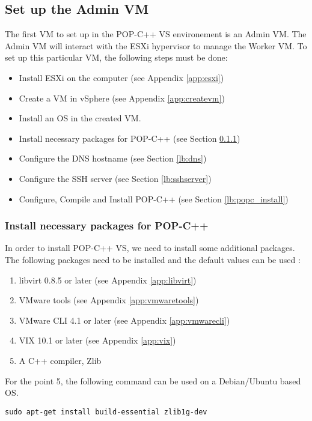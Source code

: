 \subsection{Set up the Admin VM}
\label{lb:adminvm}
The first VM to set up in the POP-C++ VS environement is an Admin VM. The Admin VM will interact with the ESXi hypervisor to manage the Worker VM. To set up this particular VM, the following steps must be done:

\begin{itemize}
\item Install ESXi on the computer (see Appendix \ref{app:esxi})
\item Create a VM in vSphere (see Appendix \ref{app:createvm})
\item Install an OS in the created VM. 
\item Install necessary packages for POP-C++ (see Section \ref{lb:packages})
\item Configure the DNS hostname (see Section \ref{lb:dns})
\item Configure the SSH server (see Section \ref{lb:sshserver})
\item Configure, Compile and Install POP-C++ (see Section \ref{lb:popc_install})
\end{itemize}

\subsubsection{Install necessary packages for POP-C++}
\label{lb:packages}
In order to install POP-C++ VS, we need to install some additional packages. The following packages need to be installed and the default values can be used : 

\begin{enumerate}
\item libvirt 0.8.5 or later (see Appendix \ref{app:libvirt})
\item VMware tools (see Appendix \ref{app:vmwaretools})
\item VMware CLI 4.1 or later (see Appendix \ref{app:vmwarecli})
\item VIX 10.1 or later (see Appendix \ref{app:vix})
\item A C++ compiler, Zlib
\end{enumerate}

For the point 5, the following command can be used on a Debian/Ubuntu based OS.\s

\begin{lstlisting}
sudo apt-get install build-essential zlib1g-dev
\end{lstlisting}





